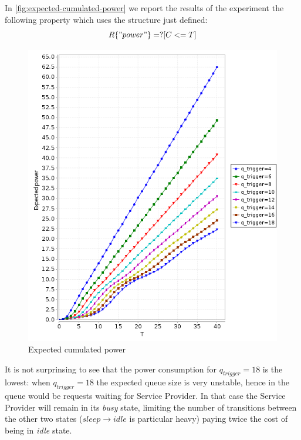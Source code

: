 In \autoref{fig:expected-cumulated-power} we report the results of the
experiment the following property which uses the structure just
defined:
\begin{displaymath}
  R\{"power"\}=? [ C<=T ]
\end{displaymath}
\begin{figure}[htb]
  \centering
  \includegraphics[width=13cm]{quantitative-project/expected-power.png}
  \caption{Expected cumulated power}
  \label{fig:expected-cumulated-power}
\end{figure}
It is not surprinsing to see that the power consumption for
$q_{trigger}=18$ is the lowest: when $q_{trigger} = 18$ the expected
queue size is very unstable, hence in the queue would be requests
waiting for Service Provider. In that case the Service Provider will
remain in its \emph{busy} state, limiting the number of transitions
between the other two states ($sleep \rightarrow idle$ is particular
heavy) paying twice the cost of being in \emph{idle} state.






